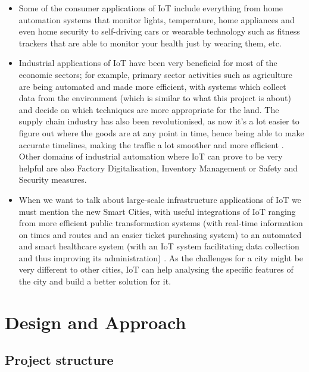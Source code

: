 \documentclass[12pt]{article}
\begin{document}
\begin{itemize}
    \item Some of the consumer applications of IoT include everything from home automation systems that monitor lights, temperature, home appliances and even home security to self-driving cars or wearable technology such as fitness trackers that are able to monitor your health just by wearing them, etc.
    \item Industrial applications of IoT have been very beneficial for most of the economic sectors; for example, primary sector activities such as agriculture are being automated and made more efficient, with systems which collect data from the environment (which is similar to what this project is about) and decide on which techniques are more appropriate for the land. The supply chain industry has also been revolutionised, as now it's a lot easier to figure out where the goods are at any point in time, hence being able to make accurate timelines, making the traffic a lot smoother and more efficient \cite{blume}. Other domains of industrial automation where IoT can prove to be very helpful are also Factory Digitalisation, Inventory Management or Safety and Security measures. 
    \item When we want to talk about large-scale infrastructure applications of IoT we must mention the new Smart Cities, with useful integrations of IoT ranging from more efficient public transformation systems (with real-time information on times and routes and an easier ticket purchasing system) to an automated and smart healthcare system (with an IoT system facilitating data collection and thus improving its administration) \cite{chathuranga}. As the challenges for a city might be very different to other cities, IoT can help analysing the specific features of the city and build a better solution for it.
\end{itemize}

\section{Design and Approach}

\subsection{Project structure}
\end{document}
